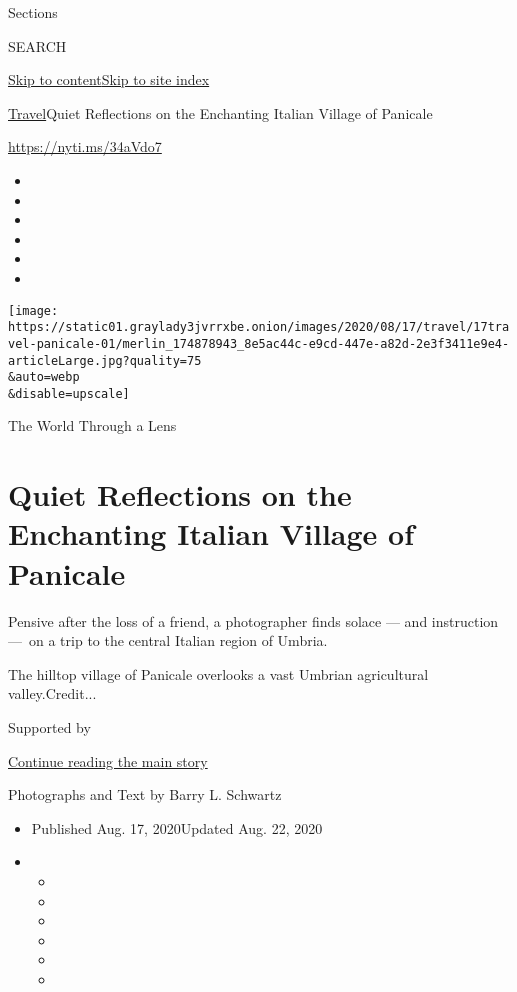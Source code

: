Sections

SEARCH

\protect\hyperlink{site-content}{Skip to
content}\protect\hyperlink{site-index}{Skip to site index}

\href{/section/travel}{Travel}\textbar{}Quiet Reflections on the
Enchanting Italian Village of Panicale

\url{https://nyti.ms/34aVdo7}

\begin{itemize}
\item
\item
\item
\item
\item
\item
\end{itemize}

\texttt{[image: https://static01.graylady3jvrrxbe.onion/images/2020/08/17/travel/17travel-panicale-01/merlin\_174878943\_8e5ac44c-e9cd-447e-a82d-2e3f3411e9e4-articleLarge.jpg?quality=75\\\&auto=webp\\\&disable=upscale]}

The World Through a Lens

\hypertarget{quiet-reflections-on-the-enchanting-italian-village-of-panicale}{%
\section{Quiet Reflections on the Enchanting Italian Village of
Panicale}\label{quiet-reflections-on-the-enchanting-italian-village-of-panicale}}

Pensive after the loss of a friend, a photographer finds solace --- and
instruction ---~on a trip to the central Italian region of Umbria.

The hilltop village of Panicale overlooks a vast Umbrian agricultural
valley.Credit...

Supported by

\protect\hyperlink{after-sponsor}{Continue reading the main story}

Photographs and Text by Barry L. Schwartz

\begin{itemize}
\item
  Published Aug. 17, 2020Updated Aug. 22, 2020
\item
  \begin{itemize}
  \item
  \item
  \item
  \item
  \item
  \item
  \end{itemize}
\end{itemize}

